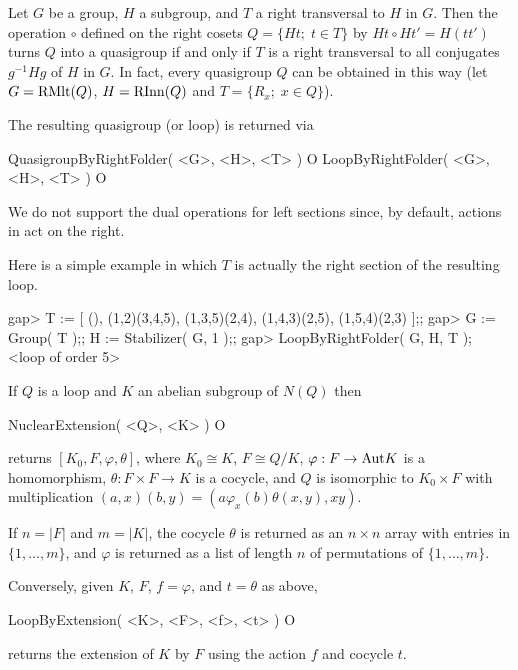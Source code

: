 
Let $G$ be a group, $H$ a subgroup, and $T$ a right transversal to $H$ in $G$. Then the operation $\circ$ defined on the right cosets $Q = \{Ht;\;t\in T\}$ by $Ht\circ Ht' = H(tt')$ turns $Q$ into a quasigroup if and only if $T$ is a right transversal to all conjugates $g^{-1}Hg$ of $H$ in $G$. In fact, every quasigroup $Q$ can be obtained in this way (let $G={\rm{RMlt}}(Q)$, $H={\rm{RInn}}(Q)$ and $T=\{R_x;\;x\in Q\}$).

The resulting quasigroup (or loop) is returned via

\>QuasigroupByRightFolder( <G>, <H>, <T> ) O
\>LoopByRightFolder( <G>, <H>, <T> ) O

We do not support the dual operations for left sections since, by default, actions in {\GAP} act on the right.

Here is a simple example in which $T$ is actually the right section of the resulting loop.

\beginexample
gap> T := [ (), (1,2)(3,4,5), (1,3,5)(2,4), (1,4,3)(2,5), (1,5,4)(2,3) ];;
gap> G := Group( T );; H := Stabilizer( G, 1 );;
gap> LoopByRightFolder( G, H, T );
<loop of order 5>
\endexample


If $Q$ is a loop and $K$ an abelian subgroup of $N(Q)$ then

\>NuclearExtension( <Q>, <K> ) O

returns $[K_0, F, \varphi, \theta]$, where $K_0\cong K$, $F\cong Q/K$,
$\varphi:F\to{\rm{Aut}}{K}$ is a homomorphism, $\theta:F\times F\to K$ is a
cocycle, and $Q$ is isomorphic to $K_0\times F$ with multiplication $(a,x)(b,y)
= (a\varphi_x(b)\theta(x,y),xy)$.

If $n=|F|$ and $m=|K|$, the cocycle $\theta$ is returned as an $n\times n$
array with entries in $\{1,\dots,m\}$, and $\varphi$ is returned as a list of
length $n$ of permutations of $\{1,\dots,m\}$.

Conversely, given $K$, $F$, $f = \varphi$, and $t = \theta$ as above,

\>LoopByExtension( <K>, <F>, <f>, <t> ) O

returns the extension of $K$ by $F$ using the action $f$ and cocycle $t$.

